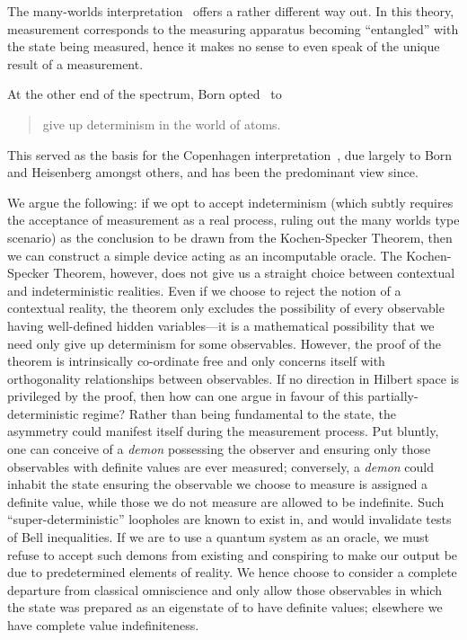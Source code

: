 \documentclass[10pt]{article}
\begin{document}
The many-worlds interpretation~\cite{everett} offers a rather different way out.
In this theory, measurement corresponds to the measuring apparatus becoming ``entangled'' with the state being measured, hence it makes no sense to even speak of the unique result of a measurement.

At the other end of the spectrum, Born opted~\cite{born-26-1} to
\begin{quote}
	give up determinism in the world of atoms.
\end{quote}
This served as the basis for the Copenhagen interpretation~\cite{wheeler-Zurek:83}, due largely to Born and Heisenberg amongst others, and has been the predominant view since.


We argue the following: if we opt to accept indeterminism (which subtly requires the acceptance of measurement as a real process, ruling out the many worlds type scenario) as the conclusion to be drawn from the Kochen-Specker Theorem, then we can construct a simple device acting as an incomputable oracle.
The Kochen-Specker Theorem, however, does not give us a straight choice between contextual and indeterministic realities.
Even if we choose to reject the notion of a contextual reality, the theorem only excludes the possibility of every observable having well-defined hidden variables---it is a mathematical possibility that we need only give up determinism for some observables.
However, the proof of the theorem is intrinsically co-ordinate free and only concerns itself with orthogonality relationships between observables.
If no direction in Hilbert space is privileged by the proof, then how can one argue in favour of this partially-deterministic regime?
Rather than being fundamental to the state, the asymmetry could manifest itself during the measurement process.
Put bluntly, one can conceive of a {\em demon} possessing the observer and ensuring only those observables with definite values are ever measured;
conversely,  a {\em demon} could inhabit the state ensuring the observable we choose to measure is assigned a definite value, while those we do not measure are allowed to be indefinite.
Such ``super-deterministic'' loopholes are known to exist in, and would invalidate tests of Bell inequalities.
If we are to use a quantum system as an oracle, we must refuse to accept such demons from existing and conspiring to make our output be due to predetermined elements of reality.
We hence choose to consider a complete departure from classical omniscience and only allow those observables in which the state was prepared as an eigenstate of to have definite values; elsewhere we have complete value indefiniteness.
\end{document}
